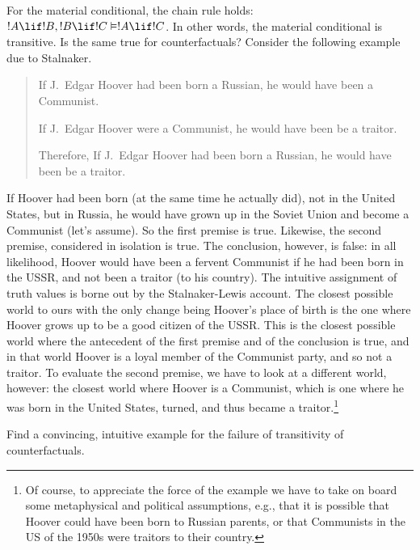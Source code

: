 \documentclass[../../../include/open-logic-section]{subfiles}
\begin{document}


For the material conditional, the chain rule holds: $!A \lif !B, !B
\lif !C \Entails !A \lif !C$. In other words, the material conditional
is transitive. Is the same true for counterfactuals? Consider the
following example due to Stalnaker.
\begin{quote}
  If J.~Edgar Hoover had been born a Russian, he would have been a Communist.

  If J.~Edgar Hoover were a Communist, he would have been be a traitor.

  Therefore, If J.~Edgar Hoover had been born a Russian, he would have
  been be a traitor.
\end{quote}
If Hoover had been born (at the same time he actually did), not in the
United States, but in Russia, he would have grown up in the Soviet
Union and become a Communist (let's assume). So the first premise is
true. Likewise, the second premise, considered in isolation is
true. The conclusion, however, is false: in all likelihood, Hoover
would have been a fervent Communist if he had been born in the USSR,
and not been a traitor (to his country).  The intuitive assignment of
truth values is borne out by the Stalnaker-Lewis account. The closest
possible world to ours with the only change being Hoover's place of
birth is the one where Hoover grows up to be a good citizen of the
USSR. This is the closest possible world where the antecedent of the
first premise and of the conclusion is true, and in that world Hoover
is a loyal member of the Communist party, and so not a traitor. To
evaluate the second premise, we have to look at a different world,
however: the closest world where Hoover is a Communist, which is one
where he was born in the United States, turned, and thus became a
traitor.\footnote{Of course, to appreciate the force of the example we
  have to take on board some metaphysical and political assumptions,
  e.g., that it is possible that Hoover could have been born to
  Russian parents, or that Communists in the US of the 1950s were
  traitors to their country.}

\begin{prob}
  Find a convincing, intuitive example for the failure of transitivity
  of counterfactuals.
\end{prob}
\end{document}
